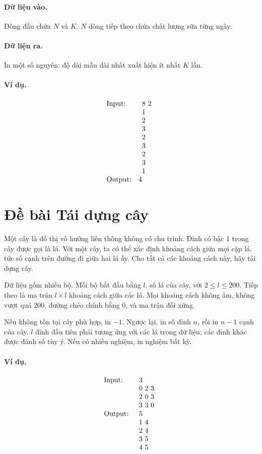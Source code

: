 \documentclass[11pt]{article}
\begin{document}
\paragraph{Dữ liệu vào.}
Dòng đầu chứa \(N\) và \(K\). \(N\) dòng tiếp theo chứa chất lượng sữa từng
ngày.

\paragraph{Dữ liệu ra.}
In một số nguyên: độ dài mẫu dài nhất xuất hiện ít nhất \(K\) lần.

\paragraph{Ví dụ.}
\[
\begin{array}{ll}
\text{Input:}&
\begin{array}[t]{l}
8\ 2\\
1\\2\\3\\2\\3\\2\\3\\1
\end{array}\\[1em]
\text{Output:}&4
\end{array}
\]

\section{Đề bài Tái dựng cây}

Một cây là đồ thị vô hướng liên thông không có chu trình. Đỉnh có bậc \(1\)
trong cây được gọi là lá. Với một cây, ta có thể xác định khoảng cách giữa
mọi cặp lá, tức số cạnh trên đường đi giữa hai lá ấy. Cho tất cả các khoảng
cách này, hãy tái dựng cây.

Dữ liệu gồm nhiều bộ. Mỗi bộ bắt đầu bằng \(l\), số lá của cây, với
\(2\le l\le 200\). Tiếp theo là ma trận \(l\times l\) khoảng cách giữa các lá.
Mọi khoảng cách không âm, không vượt quá \(200\), đường chéo chính bằng \(0\),
và ma trận đối xứng.

Nếu không tồn tại cây phù hợp, in \(-1\). Ngược lại, in số đỉnh \(n\), rồi in
\(n-1\) cạnh của cây. \(l\) đỉnh đầu tiên phải tương ứng với các lá trong dữ
liệu; các đỉnh khác được đánh số tùy ý. Nếu có nhiều nghiệm, in nghiệm bất kỳ.

\paragraph{Ví dụ.}
\[
\begin{array}{ll}
\text{Input:}&
\begin{array}[t]{l}
3\\
0\ 2\ 3\\
2\ 0\ 3\\
3\ 3\ 0
\end{array}\\[1em]
\text{Output:}&
\begin{array}[t]{l}
5\\
1\ 4\\
2\ 4\\
3\ 5\\
4\ 5
\end{array}
\end{array}
\]
\end{document}
